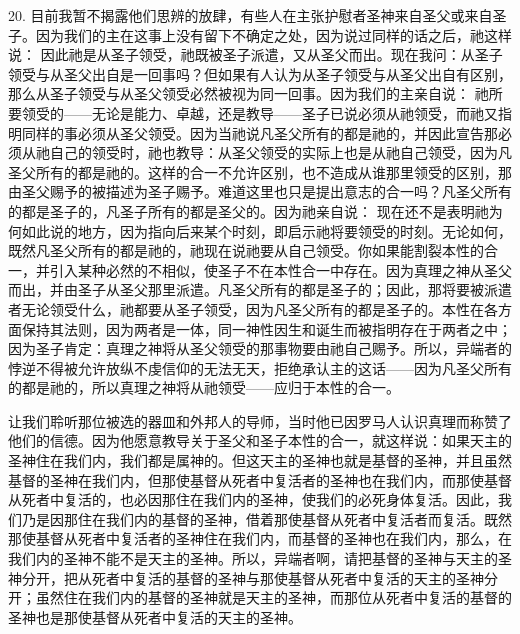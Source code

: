 20. 目前我暂不揭露他们思辨的放肆，有些人在主张护慰者圣神来自圣父或来自圣子。因为我们的主在这事上没有留下不确定之处，因为说过同样的话之后，祂这样说： 因此祂是从圣子领受，祂既被圣子派遣，又从圣父而出。现在我问：从圣子领受与从圣父出自是一回事吗？但如果有人认为从圣子领受与从圣父出自有区别，那么从圣子领受与从圣父领受必然被视为同一回事。因为我们的主亲自说： 祂所要领受的——无论是能力、卓越，还是教导——圣子已说必须从祂领受，而祂又指明同样的事必须从圣父领受。因为当祂说凡圣父所有的都是祂的，并因此宣告那必须从祂自己的领受时，祂也教导：从圣父领受的实际上也是从祂自己领受，因为凡圣父所有的都是祂的。这样的合一不允许区别，也不造成从谁那里领受的区别，那由圣父赐予的被描述为圣子赐予。难道这里也只是提出意志的合一吗？凡圣父所有的都是圣子的，凡圣子所有的都是圣父的。因为祂亲自说： 现在还不是表明祂为何如此说的地方，因为指向后来某个时刻，即启示祂将要领受的时刻。无论如何，既然凡圣父所有的都是祂的，祂现在说祂要从自己领受。你如果能割裂本性的合一，并引入某种必然的不相似，使圣子不在本性合一中存在。因为真理之神从圣父而出，并由圣子从圣父那里派遣。凡圣父所有的都是圣子的；因此，那将要被派遣者无论领受什么，祂都要从圣子领受，因为凡圣父所有的都是圣子的。本性在各方面保持其法则，因为两者是一体，同一神性因生和诞生而被指明存在于两者之中；因为圣子肯定：真理之神将从圣父领受的那事物要由祂自己赐予。所以，异端者的悖逆不得被允许放纵不虔信仰的无法无天，拒绝承认主的这话——因为凡圣父所有的都是祂的，所以真理之神将从祂领受——应归于本性的合一。\par

让我们聆听那位被选的器皿和外邦人的导师，当时他已因罗马人认识真理而称赞了他们的信德。因为他愿意教导关于圣父和圣子本性的合一，就这样说：\newline{}\newline{}如果天主的圣神住在我们内，我们都是属神的。但这天主的圣神也就是基督的圣神，并且虽然基督的圣神在我们内，但那使基督从死者中复活者的圣神也在我们内，而那使基督从死者中复活的，也必因那住在我们内的圣神，使我们的必死身体复活。因此，我们乃是因那住在我们内的基督的圣神，借着那使基督从死者中复活者而复活。既然那使基督从死者中复活者的圣神住在我们内，而基督的圣神也在我们内，那么，在我们内的圣神不能不是天主的圣神。所以，异端者啊，请把基督的圣神与天主的圣神分开，把从死者中复活的基督的圣神与那使基督从死者中复活的天主的圣神分开；虽然住在我们内的基督的圣神就是天主的圣神，而那位从死者中复活的基督的圣神也是那使基督从死者中复活的天主的圣神。\par

